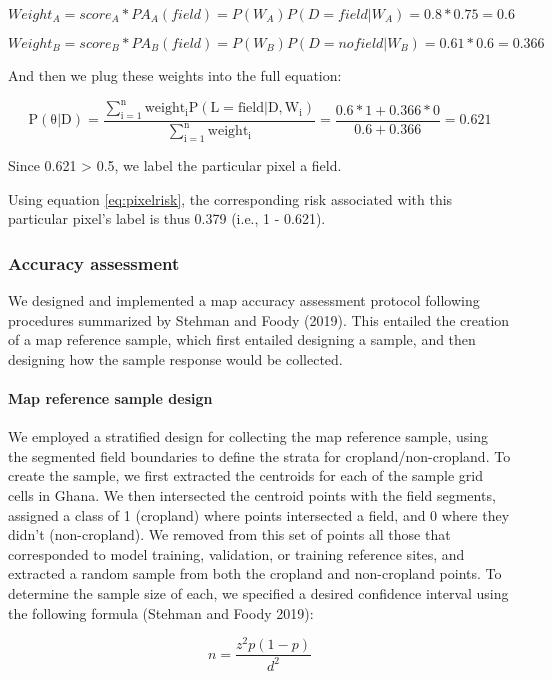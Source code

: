\documentclass[
  11pt,
  a4paper]{article}
\begin{document}
\[
Weight_A = score_A * PA_A(field) = P(W_A)P(D=field|W_A) = 0.8 * 0.75 = 0.6
\]

\[
Weight_B = score_B * PA_B(field) = P(W_B)P(D=no field|W_B) = 0.61 * 0.6 = 0.366
\]

And then we plug these weights into the full equation:

\[
\mathrm{P(\theta|D)=\frac{\sum_{i=1}^{n}weight_iP(L = field|D, W_i)}{\sum_{i=1}^{n}weight_i}} = \frac{0.6 * 1 + 0.366 * 0}{0.6 + 0.366} = 0.621
\]

Since 0.621 \textgreater{} 0.5, we label the particular pixel a field.

Using equation \ref{eq:pixelrisk}, the corresponding risk associated
with this particular pixel's label is thus 0.379 (i.e., 1 - 0.621).

\hypertarget{accuracy-assessment}{%
\subsubsection{Accuracy assessment}\label{accuracy-assessment}}

We designed and implemented a map accuracy assessment protocol following
procedures summarized by Stehman and Foody (2019). This entailed the
creation of a map reference sample, which first entailed designing a
sample, and then designing how the sample response would be collected.

\hypertarget{map-reference-sample-design}{%
\paragraph{Map reference sample
design}\label{map-reference-sample-design}}

We employed a stratified design for collecting the map reference sample,
using the segmented field boundaries to define the strata for
cropland/non-cropland. To create the sample, we first extracted the
centroids for each of the sample grid cells in Ghana. We then
intersected the centroid points with the field segments, assigned a
class of 1 (cropland) where points intersected a field, and 0 where they
didn't (non-cropland). We removed from this set of points all those that
corresponded to model training, validation, or training reference sites,
and extracted a random sample from both the cropland and non-cropland
points. To determine the sample size of each, we specified a desired
confidence interval using the following formula (Stehman and Foody
2019):

\[n = \frac{z^2p(1-p)}{d^2}\]
\end{document}
